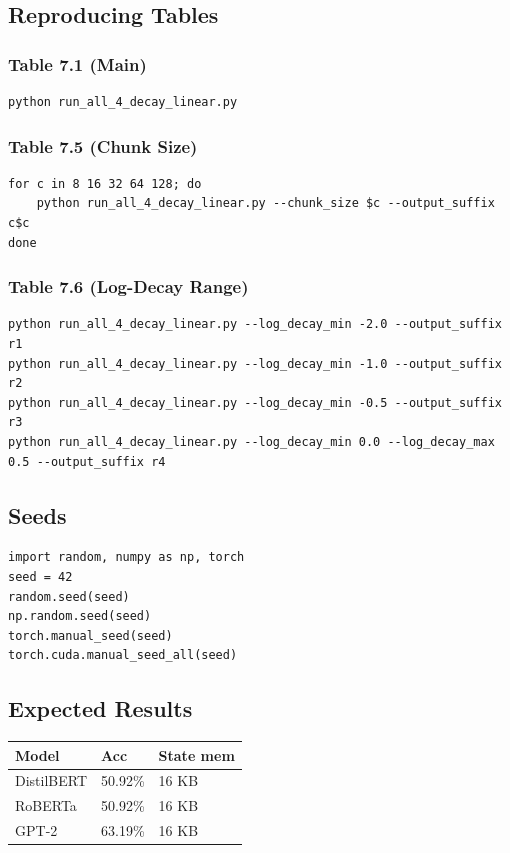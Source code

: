 \subsection{Reproducing Tables}

\subsubsection{Table 7.1 (Main)}
\begin{lstlisting}
python run_all_4_decay_linear.py
\end{lstlisting}

\subsubsection{Table 7.5 (Chunk Size)}
\begin{lstlisting}
for c in 8 16 32 64 128; do
    python run_all_4_decay_linear.py --chunk_size $c --output_suffix c$c
done
\end{lstlisting}

\subsubsection{Table 7.6 (Log-Decay Range)}
\begin{lstlisting}
python run_all_4_decay_linear.py --log_decay_min -2.0 --output_suffix r1
python run_all_4_decay_linear.py --log_decay_min -1.0 --output_suffix r2
python run_all_4_decay_linear.py --log_decay_min -0.5 --output_suffix r3
python run_all_4_decay_linear.py --log_decay_min 0.0 --log_decay_max 0.5 --output_suffix r4
\end{lstlisting}

\subsection{Seeds}

\begin{lstlisting}
import random, numpy as np, torch
seed = 42
random.seed(seed)
np.random.seed(seed)
torch.manual_seed(seed)
torch.cuda.manual_seed_all(seed)
\end{lstlisting}

\subsection{Expected Results}

\begin{table}[H]
\centering
\small
\begin{tabular}{lll}
\toprule
\textbf{Model} & \textbf{Acc} & \textbf{State mem} \\
\midrule
DistilBERT & 50.92\% & 16 KB \\
RoBERTa & 50.92\% & 16 KB \\
GPT-2 & 63.19\% & 16 KB \\
\bottomrule
\end{tabular}
\end{table}

